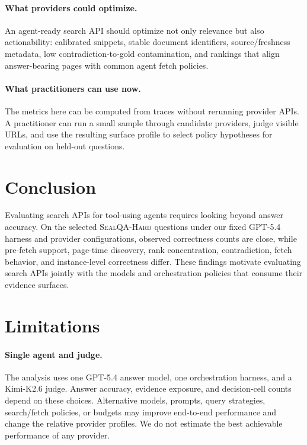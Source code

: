 \paragraph{What providers could optimize.}
An agent-ready search API should optimize not only relevance but also actionability: calibrated snippets, stable document identifiers, source/freshness metadata, low contradiction-to-gold contamination, and rankings that align answer-bearing pages with common agent fetch policies.

\paragraph{What practitioners can use now.}
The metrics here can be computed from traces without rerunning provider APIs. A practitioner can run a small sample through candidate providers, judge visible URLs, and use the resulting surface profile to select policy hypotheses for evaluation on held-out questions.

\section{Conclusion}
Evaluating search APIs for tool-using agents requires looking beyond answer accuracy. On the selected \NQueries{} \textsc{SealQA-Hard} questions under our fixed GPT-5.4 harness and provider configurations, observed correctness counts are close, while pre-fetch support, page-time discovery, rank concentration, contradiction, fetch behavior, and instance-level correctness differ. These findings motivate evaluating search APIs jointly with the models and orchestration policies that consume their evidence surfaces.

\section*{Limitations}
\label{sec:limitations}

\paragraph{Single agent and judge.}
The analysis uses one GPT-5.4 answer model, one orchestration harness, and a Kimi-K2.6 judge. Answer accuracy, evidence exposure, and decision-cell counts depend on these choices. Alternative models, prompts, query strategies, search/fetch policies, or budgets may improve end-to-end performance and change the relative provider profiles. We do not estimate the best achievable performance of any provider.

